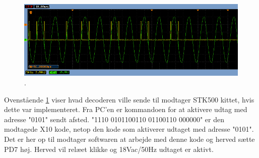 \begin{figure}[H]
	\centering
	\includegraphics[width=\textwidth]{billeder/IntTest/Modtager_0101_ON}
	\caption{.}
	\label{fig:Modtager_0101_ON}
\end{figure}

Ovenstående \ref{fig:Modtager_0101_ON} viser hvad decoderen ville sende til modtager STK500 kittet, hvis dette var implementeret. Fra PC'en er kommandoen for at aktivere udtag med adresse "0101" sendt afsted.
"1110 0101100110 01100110 000000" er den modtagede X10 kode, netop den kode som aktiverer udtaget med adresse "0101". Det er her op til modtager softwaren at arbejde med denne kode og herved sætte PD7 høj. Herved vil relæet klikke og 18Vac/50Hz udtaget er aktivt. 







